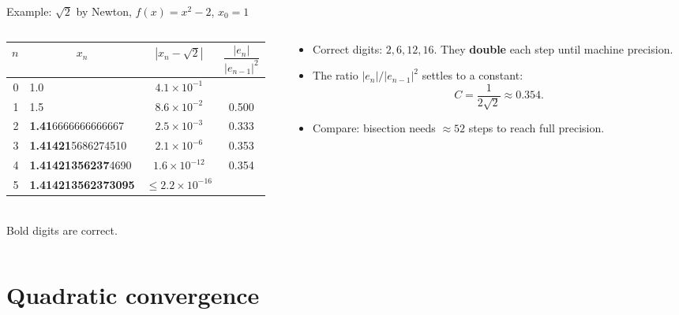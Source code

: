 \documentclass[aspectratio=169]{beamer}
\begin{document}
\begin{frame}{Example: $\sqrt2$ by Newton, $f(x) = x^2 - 2$, $x_0 = 1$}
\begin{columns}[c]
\begin{column}{0.64\textwidth}
\centering
\footnotesize
\setlength{\tabcolsep}{3.5pt}
\begin{tabular}{rlcc}
\toprule
$n$ & \multicolumn{1}{c}{$x_n$} & $|x_n - \sqrt2|$ & $\dfrac{|e_n|}{|e_{n-1}|^2}$ \\
\midrule
0 & 1.0 & $4.1\times10^{-1}$ & \\
1 & 1.5 & $8.6\times10^{-2}$ & 0.500 \\
2 & \textbf{1.41}6666666666667 & $2.5\times10^{-3}$ & 0.333 \\
3 & \textbf{1.41421}5686274510 & $2.1\times10^{-6}$ & 0.353 \\
4 & \textbf{1.41421356237}4690 & $1.6\times10^{-12}$ & 0.354 \\
5 & \textbf{1.414213562373095} & $\le 2.2\times10^{-16}$ & \\
\bottomrule
\end{tabular}\\[4pt]
\scriptsize Bold digits are correct.
\end{column}
\begin{column}{0.33\textwidth}
\small
\begin{itemize}
  \item Correct digits: $2, 6, 12, 16$. They \textbf{double} each step until machine precision.
  \item The ratio $|e_n|/|e_{n-1}|^2$ settles to a constant:
  \[
  C = \frac{1}{2\sqrt2} \approx 0.354.
  \]
  \item Compare: bisection needs $\approx 52$ steps to reach full precision.
\end{itemize}
\end{column}
\end{columns}
\end{frame}

\section{Quadratic convergence}
\end{document}
